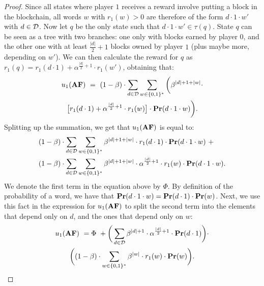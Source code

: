 \begin{proof}
Since all states where player $1$ receives a reward involve putting a block in the blockchain, all words 
$w$ with $r_1(w) > 0$ are therefore of the form $d\cdot 1\cdot w'$ with $d \in \mathcal{D}$. Now let $q$ be the only state such that $d\cdot 1\cdot w' \in \tau(q)$.
State $q$ can be seen as a tree with two branches: one only with blocks earned by player $0$, and the other one 
with at least ${\frac{|d|}{2}+1}$ blocks owned by player $1$ (plus maybe more, depending on $w'$). 
We can then calculate the reward for $q$ as $r_1(q) = r_1(d \cdot 1) + \alpha^{\frac{|d|}{2}+1}\cdot r_1(w')$, obtaining that:
\begin{multline*}
u_1(\text{\rm {\bf AF}}) \ = \ (1-\beta) \cdot \sum_{d\in \mathcal{D}} \sum_{w\in \{0,1\}^*} \bigg(\beta^{|d|+1+|w|}\cdot \\
 \big[r_1(d\cdot 1) + \alpha^{\frac{|d|}{2}+1}\cdot r_1(w)\big] \cdot \mathbf{Pr}(d\cdot 1 \cdot w)\bigg).
\end{multline*}
%
Splitting up the summation, we get that $ u_1(\text{\rm {\bf AF}})$ is equal to:
\begin{align*}
&(1-\beta) \cdot \sum_{d\in \mathcal{D}} \sum_{w\in \{0,1\}^*}\beta^{|d|+1+|w|}\cdot r_1(d\cdot 1) \cdot \mathbf{Pr}(d\cdot 1\cdot w) \ +\\
 & (1-\beta) \cdot \sum_{d\in \mathcal{D}} \sum_{w\in \{0,1\}^*}\beta^{|d|+1+|w|}\cdot \alpha^{\frac{|d|}{2}+1}\cdot r_1(w) \cdot \mathbf{Pr}(d\cdot 1 \cdot w).
\end{align*}
%
We denote the first term in the equation above by $\Phi$. 
By definition of the probability of a word, we have that $\mathbf{Pr}(d\cdot 1\cdot w) = \mathbf{Pr}(d\cdot 1)\cdot \mathbf{Pr}(w)$. 
Next, we use this fact in the expression for $u_1(\text{\rm {\bf AF}})$ to split the second term into the elements that depend only on $d$, and the ones that depend only on $w$:
%
\begin{multline*}
 u_1(\text{\rm {\bf AF}}) \ = \Phi \ + \bigg(\sum_{d\in \mathcal{D}} \beta^{|d|+1}\cdot \alpha^{\frac{|d|}{2}+1}\cdot \mathbf{Pr}(d\cdot 1)\bigg) \cdot \\
 \bigg((1-\beta) \cdot \sum_{w\in \{0,1\}^*} \beta^{|w|} \cdot r_1(w) \cdot \mathbf{Pr}(w)\bigg).
\end{multline*}

\end{proof}
